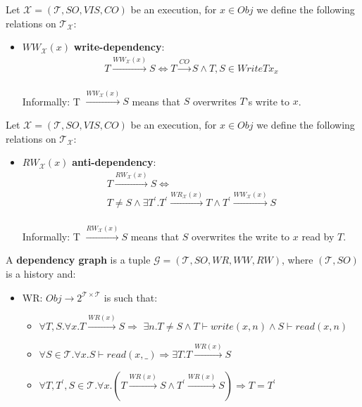 \documentclass{beamer}
\begin{document}
\begin{frame}
	Let $\mathcal{X} = (\mathcal{T}, SO, VIS, CO)$ be an execution, for $x \in Obj$ we define the following relations on $\mathcal{T}_\mathcal{X}$:
	\begin{itemize}
		\item $WW_\mathcal{X}(x)$ \textbf{write-dependency}:
		\begin{multline*}
		T \xrightarrow{WW_\mathcal{X}(x)} S \Leftrightarrow T \xrightarrow{CO}S \wedge T,S \in WriteTx_x
		\end{multline*} \\
		Informally: T $ \xrightarrow{WW_\mathcal{X}(x)} S $ means that $S$ overwrites $T$'s write to $x$.
	\end{itemize}
\end{frame}

\begin{frame}
	Let $\mathcal{X} = (\mathcal{T}, SO, VIS, CO)$ be an execution, for $x \in Obj$ we define the following relations on $\mathcal{T}_\mathcal{X}$:
	\begin{itemize}
		\item $RW_\mathcal{X}(x)$ \textbf{anti-dependency}:
		\begin{multline*}
		T \xrightarrow{RW_\mathcal{X}(x)} S \Leftrightarrow \\
		T \ne S \wedge \exists T^\prime . T^\prime \xrightarrow{WR_\mathcal{X}(x)}T \wedge T^\prime \xrightarrow{WW_\mathcal{X}(x)}S
		\end{multline*} \\
		Informally: T $ \xrightarrow{RW_\mathcal{X}(x)} S $ means that $S$ overwrites the write to $x$ read by $T$.
	\end{itemize}
\end{frame}

\begin{frame}
	A \textbf{dependency graph} is a tuple $\mathcal{G} = (\mathcal{T}, SO, WR, WW, RW)$, where $(\mathcal{T}, SO)$ is a history and:
	\begin{itemize}
		\item WR: $Obj \rightarrow 2^{\mathcal{T} \times \mathcal{T}}$ is such that:
		\begin{itemize}
			\item $\forall T,S. \forall x . T \xrightarrow{WR(x)}S \Rightarrow $ 
				  $	\exists n. T \ne S \wedge T \vdash write(x,n) \wedge S \vdash read(x,n)$
			\item $\forall S \in \mathcal{T}. \forall x. S \vdash read(x,\_) \Rightarrow \exists T. T \xrightarrow{WR(x)} S $
			\item $\forall T, T^\prime, S \in \mathcal{T}. \forall x. \left( T \xrightarrow{WR(x)} S \wedge T^\prime \xrightarrow{WR(x)} S \right) \Rightarrow T = T^\prime $
		\end{itemize}
	\end{itemize}
\end{frame}
\end{document}
